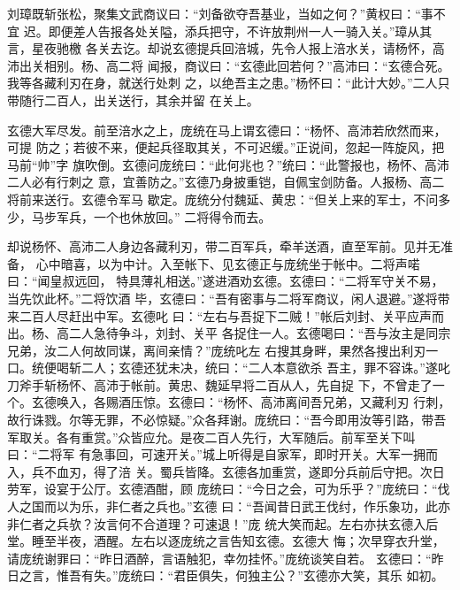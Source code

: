 刘璋既斩张松，聚集文武商议曰：“刘备欲夺吾基业，当如之何？”黄权曰：“事不宜
迟。即便差人告报各处关隘，添兵把守，不许放荆州一人一骑入关。”璋从其言，星夜驰檄
各关去讫。却说玄德提兵回涪城，先令人报上涪水关，请杨怀，高沛出关相别。杨、高二将
闻报，商议曰：“玄德此回若何？”高沛曰：“玄德合死。我等各藏利刃在身，就送行处刺
之，以绝吾主之患。”杨怀曰：“此计大妙。”二人只带随行二百人，出关送行，其余并留
在关上。

玄德大军尽发。前至涪水之上，庞统在马上谓玄德曰：“杨怀、高沛若欣然而来，可提
防之；若彼不来，便起兵径取其关，不可迟缓。”正说间，忽起一阵旋风，把马前“帅”字
旗吹倒。玄德问庞统曰：“此何兆也？”统曰：“此警报也，杨怀、高沛二人必有行刺之
意，宜善防之。”玄德乃身披重铠，自佩宝剑防备。人报杨、高二将前来送行。玄德令军马
歇定。庞统分付魏延、黄忠：“但关上来的军士，不问多少，马步军兵，一个也休放回。”
二将得令而去。

却说杨怀、高沛二人身边各藏利刃，带二百军兵，牵羊送酒，直至军前。见并无准备，
心中暗喜，以为中计。入至帐下、见玄德正与庞统坐于帐中。二将声喏曰：“闻皇叔远回，
特具薄礼相送。”遂进酒劝玄德。玄德曰：“二将军守关不易，当先饮此杯。”二将饮酒
毕，玄德曰：“吾有密事与二将军商议，闲人退避。”遂将带来二百人尽赶出中军。玄德叱
曰：“左右与吾捉下二贼！”帐后刘封、关平应声而出。杨、高二人急待争斗，刘封、关平
各捉住一人。玄德喝曰：“吾与汝主是同宗兄弟，汝二人何故同谋，离间亲情？”庞统叱左
右搜其身畔，果然各搜出利刃一口。统便喝斩二人；玄德还犹未决，统曰：“二人本意欲杀
吾主，罪不容诛。”遂叱刀斧手斩杨怀、高沛于帐前。黄忠、魏延早将二百从人，先自捉
下，不曾走了一个。玄德唤入，各赐酒压惊。玄德曰：“杨怀、高沛离间吾兄弟，又藏利刃
行刺，故行诛戮。尔等无罪，不必惊疑。”众各拜谢。庞统曰：“吾今即用汝等引路，带吾
军取关。各有重赏。”众皆应允。是夜二百人先行，大军随后。前军至关下叫曰：“二将军
有急事回，可速开关。”城上听得是自家军，即时开关。大军一拥而入，兵不血刃，得了涪
关。蜀兵皆降。玄德各加重赏，遂即分兵前后守把。次日劳军，设宴于公厅。玄德酒酣，顾
庞统曰：“今日之会，可为乐乎？”庞统曰：“伐人之国而以为乐，非仁者之兵也。”玄德
曰：“吾闻昔日武王伐纣，作乐象功，此亦非仁者之兵欤？汝言何不合道理？可速退！”庞
统大笑而起。左右亦扶玄德入后堂。睡至半夜，酒醒。左右以逐庞统之言告知玄德。玄德大
悔；次早穿衣升堂，请庞统谢罪曰：“昨日酒醉，言语触犯，幸勿挂怀。”庞统谈笑自若。
玄德曰：“昨日之言，惟吾有失。”庞统曰：“君臣俱失，何独主公？”玄德亦大笑，其乐
如初。

